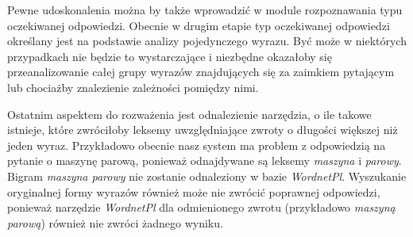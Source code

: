 Pewne udoskonalenia można by także wprowadzić w module rozpoznawania typu oczekiwanej odpowiedzi. Obecnie w drugim etapie typ oczekiwanej odpowiedzi określany jest na podstawie analizy pojedynczego wyrazu. Być może w niektórych przypadkach nie będzie to wystarczające i niezbędne okazałoby się przeanalizowanie całej grupy wyrazów znajdujących się za zaimkiem pytającym lub chociażby znalezienie zależności pomiędzy nimi. 

Ostatnim aspektem do rozważenia jest odnalezienie narzędzia, o ile takowe istnieje, które zwróciłoby leksemy uwzględniające zwroty o długości większej niż jeden wyraz. Przykładowo obecnie nasz system ma problem z odpowiedzią na pytanie o maszynę parową, ponieważ odnajdywane są leksemy \emph{maszyna} i \emph{parowy}. Bigram \emph{maszyna parowy} nie zostanie odnaleziony w bazie \emph{WordnetPl}. Wyszukanie oryginalnej formy wyrazów również może nie zwrócić poprawnej odpowiedzi, ponieważ narzędzie \emph{WordnetPl} dla odmienionego zwrotu (przykładowo \emph{maszyną parową}) również nie zwróci żadnego wyniku.

